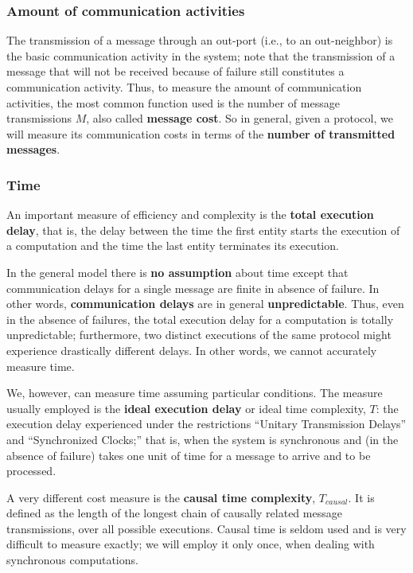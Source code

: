 \subsubsection{Amount of communication activities}
The transmission of a message through an out-port (i.e., to an out-neighbor) is the basic communication activity in the system; note that the transmission of a message that will not be received because of failure still constitutes a communication activity. Thus, to measure the amount of communication activities, the most common function used is the number of message transmissions $M$, also called \textbf{message cost}. So in general, given a protocol, we will measure its communication costs in terms of the \textbf{number of transmitted messages}.

\subsubsection{Time}
An important measure of efficiency and complexity is the \textbf{total execution delay}, that is, the delay between the time the first entity starts the execution of a computation and the time the last entity terminates its execution.

In the general model there is \textbf{no assumption} about time except that communication delays for a single message are finite in absence of failure. In other words, \textbf{communication delays} are in general \textbf{unpredictable}. Thus, even in the absence of failures, the total execution delay for a computation is totally unpredictable; furthermore, two distinct executions of the same protocol might experience drastically different delays. In other words, we cannot accurately measure time. 

We, however, can measure time assuming particular conditions. The measure usually employed is the \textbf{ideal execution delay} or ideal time complexity, $T$: the execution delay experienced under the restrictions “Unitary Transmission Delays” and “Synchronized Clocks;” that is, when the system is synchronous and (in the absence of failure) takes one unit of time for a message to arrive and to be processed. 

A very different cost measure is the \textbf{causal time complexity}, $T_{causal}$. It is defined as the length of the longest chain of causally related message transmissions, over all possible executions. Causal time is seldom used and is very difficult to measure exactly; we will employ it only once, when dealing with synchronous computations.

